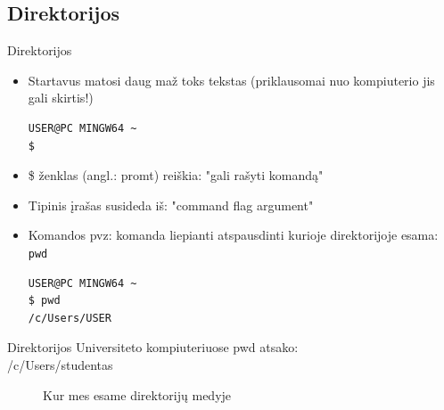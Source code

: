 \documentclass[11pt,xcolor=table]{beamer}
\begin{document}
\subsection{Direktorijos}

\begin{frame}[fragile]{Direktorijos}
\begin{itemize}
\item Startavus matosi daug maž toks tekstas (priklausomai nuo kompiuterio jis gali skirtis!)

\begin{lstlisting}
USER@PC MINGW64 ~
$ 
\end{lstlisting}

\item \$ ženklas (angl.: promt) reiškia: "gali rašyti komandą"
\item Tipinis įrašas susideda iš: "command flag argument"
\item Komandos pvz: komanda liepianti atspausdinti kurioje direktorijoje esama: \colorbox{listinggray}{\lstinline|pwd|}

\begin{lstlisting}
USER@PC MINGW64 ~
$ pwd
/c/Users/USER
\end{lstlisting}

\end{itemize}
\end{frame}

\begin{frame}[fragile]{Direktorijos}
Universiteto kompiuteriuose pwd atsako:
\\/c/Users/studentas

\begin{figure}
\caption{Kur mes esame direktorijų medyje}

\end{figure}
\end{frame}


\end{document}
